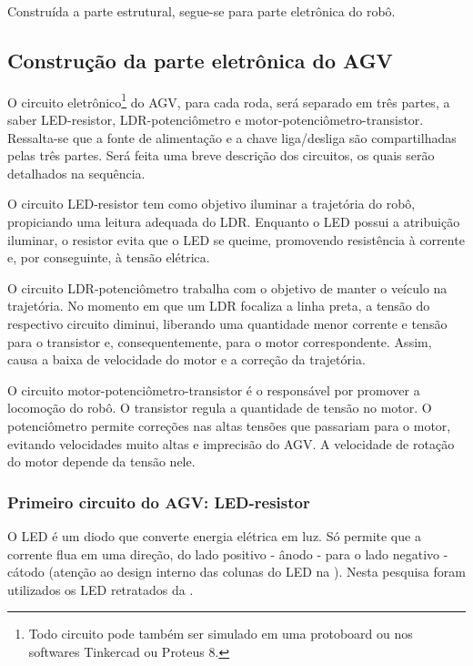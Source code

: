 \documentclass{textolivre-html}
\begin{document}
Construída a parte estrutural, segue-se para parte eletrônica do robô.


\subsection{Construção da parte eletrônica do AGV}\label{sec-constr-eletr}
O circuito eletrônico\footnote{Todo circuito pode também ser simulado em uma
protoboard ou nos softwares Tinkercad ou Proteus 8.} do AGV, para cada roda,
será separado em três partes, a saber LED-resistor, LDR-potenciômetro e
motor-potenciômetro-transistor. Ressalta-se que a fonte de alimentação e a
chave liga/desliga são compartilhadas pelas três partes. Será feita uma breve
descrição dos circuitos, os quais serão detalhados na sequência.

O circuito LED-resistor tem como objetivo iluminar a trajetória do robô,
propiciando uma leitura adequada do LDR. Enquanto o LED possui a atribuição
iluminar, o resistor evita que o LED se queime, promovendo resistência à
corrente e, por conseguinte, à tensão elétrica.

O circuito LDR-potenciômetro trabalha com o objetivo de manter o veículo na
trajetória. No momento em que um LDR focaliza a linha preta, a tensão do
respectivo circuito diminui, liberando uma quantidade menor corrente e tensão
para o transistor e, consequentemente, para o motor correspondente. Assim,
causa a baixa de velocidade do motor e a correção da trajetória.

O circuito motor-potenciômetro-transistor é o responsável por promover a
locomoção do robô. O transistor regula a quantidade de tensão no motor. O
potenciômetro permite correções nas altas tensões que passariam para o motor,
evitando velocidades muito altas e imprecisão do AGV. A velocidade de rotação do motor depende da tensão nele.


\subsubsection{Primeiro circuito do AGV: LED-resistor}\label{sec-prim-circ}
O LED é um diodo que converte energia elétrica em luz. Só permite que a
corrente flua em uma direção, do lado positivo - ânodo - para o lado negativo -
cátodo (atenção ao design interno das colunas do LED na ). Nesta
pesquisa foram utilizados os LED retratados da .
\end{document}
